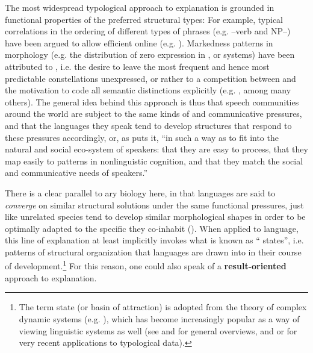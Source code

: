 \documentclass[output=paper]{langsci/langscibook}
\begin{document}
The most widespread typological approach to explanation is grounded in functional properties of the preferred structural types: For example, typical correlations in the ordering of different types of phrases (e.g. –verb and NP–) have been argued to allow efficient online  (e.g. \citealt{Hawkins1994_Perf,Hawkins2004_Eff}). Markedness patterns in morphology (e.g. the distribution of zero expression in ,  or  systems) have been attributed to , i.e. the desire to leave the most frequent and hence most predictable constellations unexpressed, or rather to a competition between  and the motivation to code all semantic distinctions explicitly (e.g. \citealt{Haiman1983,Comrie1989,Aissen2003,Croft2003,Haspelmath2008_Econ}, among many others). The general idea behind this approach is thus that speech communities around the world are subject to the same kinds of  and communicative pressures, and that the languages they speak tend to develop structures that respond to these pressures accordingly, or, as \citet[118]{Bickel2014} puts it, “in such a way as to fit into the natural and social eco-system of speakers: that they are easy to process, that they map easily to patterns in nonlinguistic cognition, and that they match the social and communicative needs of speakers.” 

There is a clear parallel to ary biology here, in that languages are said to \textit{converge} on similar structural solutions under the same functional pressures, just like unrelated species tend to develop similar morphological shapes in order to be optimally adapted to the specific  they co-inhabit (\citealt{Deacon1997,Caldwell2008,EvansLevinson2009,Givón2010}). When applied to language, this line of explanation at least implicitly invokes what is known as “ states”, i.e. patterns of structural organization that languages are drawn into in their course of development.\footnote{The term  state (or basin of attraction) is adopted from the theory of complex dynamic systems (e.g.  \citealt{Cooper1999,HoweLewis2005,Holland2006}), which has become increasingly popular as a way of viewing linguistic systems as well (see \citealt{BecknerEtAl2009} and \citealt{Port2009} for general overviews, and \citealt{Haig2018} or \citealt{Nichols2018} for very recent applications to typological data).} For this reason, one could also speak of a \textbf{result-oriented} approach to explanation. 
\end{document}
